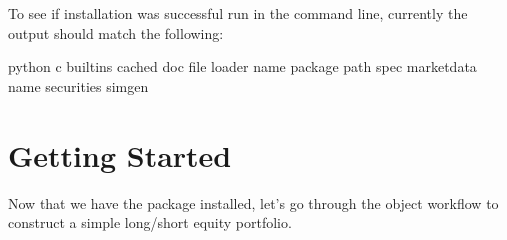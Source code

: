 \documentclass[letterpaper,10pt,english]{sphinxmanual}
\begin{document}
\sphinxAtStartPar
To see if installation was successful run
 in
the command line, currently the output should match the following:

\begin{sphinxVerbatim}[commandchars=\\\{\}]
\PYGZdl{} python \PYGZhy{}c 
\PYGZus{}\PYGZus{}builtins\PYGZus{}\PYGZus{}
\PYGZus{}\PYGZus{}cached\PYGZus{}\PYGZus{}
\PYGZus{}\PYGZus{}doc\PYGZus{}\PYGZus{}
\PYGZus{}\PYGZus{}file\PYGZus{}\PYGZus{}
\PYGZus{}\PYGZus{}loader\PYGZus{}\PYGZus{}
\PYGZus{}\PYGZus{}name\PYGZus{}\PYGZus{}
\PYGZus{}\PYGZus{}package\PYGZus{}\PYGZus{}
\PYGZus{}\PYGZus{}path\PYGZus{}\PYGZus{}
\PYGZus{}\PYGZus{}spec\PYGZus{}\PYGZus{}
market\PYGZus{}data
name
securities
simgen
\end{sphinxVerbatim}


\section{Getting Started}
\label{\detokenize{gettingstarted:getting-started}}
\sphinxAtStartPar
Now that we have the package installed, let’s go through the object
workflow to construct a simple long/short equity portfolio.
\end{document}
